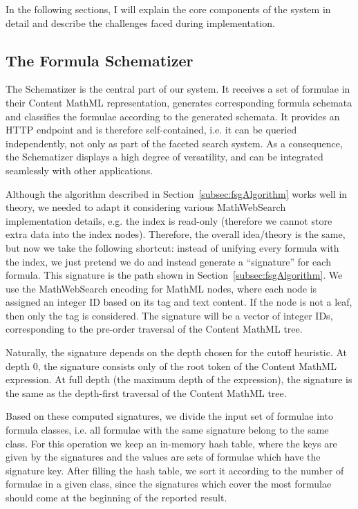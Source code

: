 \documentclass[a4paper,oneside]{article}
\def\mws{\textsf{MathWebSearch}\xspace}
\def\cmml{\textsf{Content MathML}\xspace}
\def\mathml{\textsf{MathML}\xspace}
\begin{document}
In the following sections, I will explain the core components of
the system in detail and describe the challenges faced during
implementation.

\subsection{The Formula Schematizer}\label{subsec:fschematizer}
The Schematizer is the central part of our system. It receives a set of
formulae in their \cmml representation, generates corresponding formula
schemata and classifies the formulae according to the generated schemata.
It provides an HTTP endpoint and is therefore self-contained, i.e. it can be
queried independently, not only as part of the faceted search system.
As a consequence, the Schematizer displays a high degree of versatility,
and can be integrated seamlessly with other applications.

Although the algorithm described in Section~\ref{subsec:fsgAlgorithm} works
well in theory, we needed to adapt it considering various \mws implementation
details, e.g. the index is read-only (therefore we cannot store extra data into
the index nodes). Therefore, the overall idea/theory is the same, but now we
take the following shortcut: instead of unifying every formula with the index,
we just pretend we do and instead generate a ``signature'' for each formula.
This signature is the path shown in Section~\ref{subsec:fsgAlgorithm}. We use
the \mws encoding for \mathml nodes, where each node is assigned an integer ID
based on its tag and text content. If the node is not a leaf, then only the tag
is considered. The signature will be a vector of integer IDs, corresponding to
the pre-order traversal of the \cmml tree.

Naturally, the signature depends on the depth chosen for the cutoff heuristic.
At depth 0, the signature consists only of the root token of the \cmml
expression. At full depth (the maximum depth of the expression), the signature
is the same as the depth-first traversal of the \cmml tree.

Based on these computed signatures, we divide the input set of formulae into
formula classes, i.e. all formulae with the same signature belong to the same
class. For this operation we keep an in-memory hash table, where the keys are
given by the signatures and the values are sets of formulae which have the
signature key. After filling the hash table, we sort it according to the number
of formulae in a given class, since the signatures which cover the most
formulae should come at the beginning of the reported result.
\end{document}
